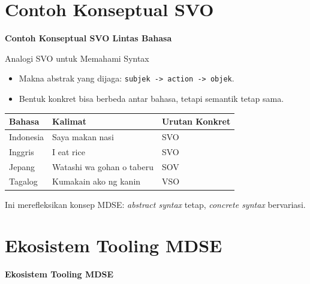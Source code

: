 \documentclass[aspectratio=169, table]{beamer}
\begin{document}
\section{Contoh Konseptual SVO}
\begin{frame}{\hfill}
	\centering
	\Huge{\textbf{Contoh Konseptual SVO Lintas Bahasa}}
\end{frame}

\begin{frame}{Analogi SVO untuk Memahami Syntax}
\vspace{6pt}
\begin{itemize}
  \item Makna abstrak yang dijaga: \texttt{subjek -> action -> objek}.
  \item Bentuk konkret bisa berbeda antar bahasa, tetapi semantik tetap sama.
\end{itemize}

\vspace{8pt}
\begin{tabular}{|l|l|l|}
\hline
\textbf{Bahasa} & \textbf{Kalimat} & \textbf{Urutan Konkret} \\
\hline
Indonesia & Saya makan nasi & SVO \\
Inggris & I eat rice & SVO \\
Jepang & Watashi wa gohan o taberu & SOV \\
Tagalog & Kumakain ako ng kanin & VSO \\
\hline
\end{tabular}

\vspace{8pt}
\small
Ini merefleksikan konsep MDSE: \textit{abstract syntax} tetap, \textit{concrete syntax} bervariasi.
\end{frame}

\section{Ekosistem Tooling MDSE}
\begin{frame}{\hfill}
	\centering
	\Huge{\textbf{Ekosistem Tooling MDSE}}
\end{frame}
\end{document}
